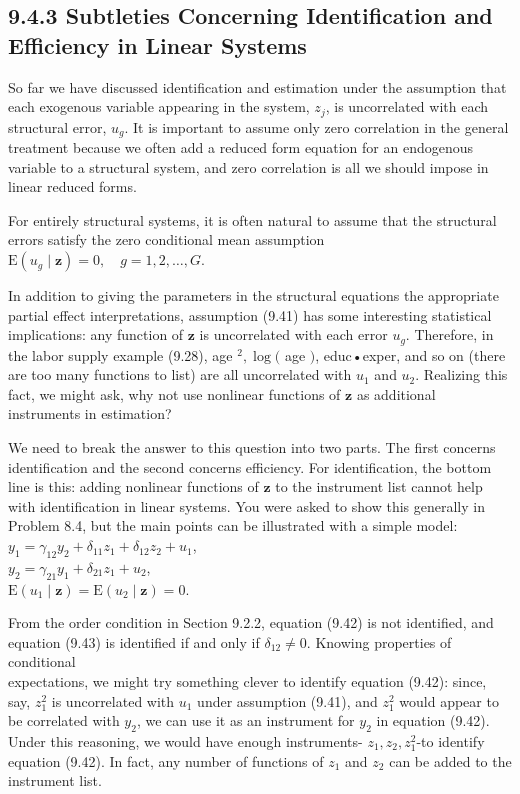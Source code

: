 \documentclass[10pt]{article}
\begin{document}
\subsection*{9.4.3 Subtleties Concerning Identification and Efficiency in Linear Systems}
So far we have discussed identification and estimation under the assumption that each exogenous variable appearing in the system, $z_{j}$, is uncorrelated with each structural error, $u_{g}$. It is important to assume only zero correlation in the general treatment because we often add a reduced form equation for an endogenous variable to a structural system, and zero correlation is all we should impose in linear reduced forms.

For entirely structural systems, it is often natural to assume that the structural errors satisfy the zero conditional mean assumption\\
$\mathrm{E}\left(u_{g} \mid \mathbf{z}\right)=0, \quad g=1,2, \ldots, G$.

In addition to giving the parameters in the structural equations the appropriate partial effect interpretations, assumption (9.41) has some interesting statistical implications: any function of $\mathbf{z}$ is uncorrelated with each error $u_{g}$. Therefore, in the labor supply example (9.28), age ${ }^{2}, \log ($ age $)$, educ•exper, and so on (there are too many functions to list) are all uncorrelated with $u_{1}$ and $u_{2}$. Realizing this fact, we might ask, why not use nonlinear functions of $\mathbf{z}$ as additional instruments in estimation?

We need to break the answer to this question into two parts. The first concerns identification and the second concerns efficiency. For identification, the bottom line is this: adding nonlinear functions of $\mathbf{z}$ to the instrument list cannot help with identification in linear systems. You were asked to show this generally in Problem 8.4, but the main points can be illustrated with a simple model:\\
$y_{1}=\gamma_{12} y_{2}+\delta_{11} z_{1}+\delta_{12} z_{2}+u_{1}$,\\
$y_{2}=\gamma_{21} y_{1}+\delta_{21} z_{1}+u_{2}$,\\
$\mathrm{E}\left(u_{1} \mid \mathbf{z}\right)=\mathrm{E}\left(u_{2} \mid \mathbf{z}\right)=0$.

From the order condition in Section 9.2.2, equation (9.42) is not identified, and equation (9.43) is identified if and only if $\delta_{12} \neq 0$. Knowing properties of conditional\\
expectations, we might try something clever to identify equation (9.42): since, say, $z_{1}^{2}$ is uncorrelated with $u_{1}$ under assumption (9.41), and $z_{1}^{2}$ would appear to be correlated with $y_{2}$, we can use it as an instrument for $y_{2}$ in equation (9.42). Under this reasoning, we would have enough instruments- $z_{1}, z_{2}, z_{1}^{2}$-to identify equation (9.42). In fact, any number of functions of $z_{1}$ and $z_{2}$ can be added to the instrument list.
\end{document}
